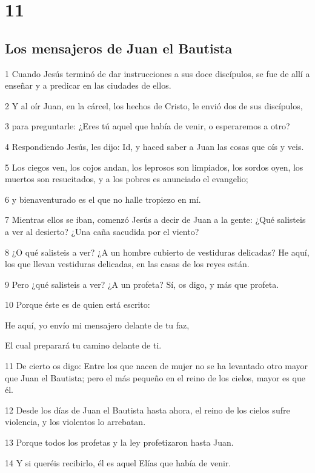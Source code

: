 \chapter{11}

\section*{Los mensajeros de Juan el Bautista}

\par 1 Cuando Jesús terminó de dar instrucciones a sus doce discípulos, se fue de allí a enseñar y a predicar en las ciudades de ellos.
\par 2 Y al oír Juan, en la cárcel, los hechos de Cristo, le envió dos de sus discípulos,
\par 3 para preguntarle: ¿Eres tú aquel que había de venir, o esperaremos a otro?
\par 4 Respondiendo Jesús, les dijo: Id, y haced saber a Juan las cosas que oís y veis.
\par 5 Los ciegos ven, los cojos andan, los leprosos son limpiados, los sordos oyen, los muertos son resucitados, y a los pobres es anunciado el evangelio;
\par 6 y bienaventurado es el que no halle tropiezo en mí.
\par 7 Mientras ellos se iban, comenzó Jesús a decir de Juan a la gente: ¿Qué salisteis a ver al desierto? ¿Una caña sacudida por el viento?
\par 8 ¿O qué salisteis a ver? ¿A un hombre cubierto de vestiduras delicadas? He aquí, los que llevan vestiduras delicadas, en las casas de los reyes están.
\par 9 Pero ¿qué salisteis a ver? ¿A un profeta? Sí, os digo, y más que profeta.
\par 10 Porque éste es de quien está escrito:
\par He aquí, yo envío mi mensajero delante de tu faz,
\par El cual preparará tu camino delante de ti.
\par 11 De cierto os digo: Entre los que nacen de mujer no se ha levantado otro mayor que Juan el Bautista; pero el más pequeño en el reino de los cielos, mayor es que él.
\par 12 Desde los días de Juan el Bautista hasta ahora, el reino de los cielos sufre violencia, y los violentos lo arrebatan.
\par 13 Porque todos los profetas y la ley profetizaron hasta Juan.
\par 14 Y si queréis recibirlo, él es aquel Elías que había de venir.

